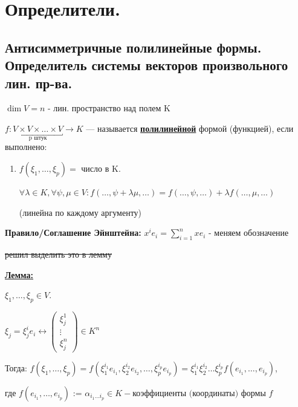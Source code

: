 \section{Определители.}

\subsection{Антисимметричные полилинейные формы. Определитель системы векторов произвольного лин. пр-ва.}

\(\dim V = n\) - лин. пространство над полем K

\(f: \underbracket{V \times V \times \ldots \times V}_{\text{p штук}} \rightarrow K\) --- называется \uline{\textbf{полилинейной}} формой (функцией), если выполнено:

\begin{enumerate}
    \item[]

          \(f(\xi_1,\ldots,\xi_p) = \) число в K.

          \(\forall \lambda \in K, \forall \psi, \mu \in V: f(\ldots,\psi + \lambda \mu,\ldots) = f(\ldots, \psi, \ldots) + \lambda f(\ldots,\mu,\ldots)\)

          (линейна по каждому аргументу)
\end{enumerate}



\textbf{Правило/Соглашение Эйнштейна:} \(x^i e_i = \sum\limits_{i=1}^n x e_i\) - меняем обозначение


\sout{решил выделить это в лемму} %

\uline{\textbf{Лемма:}}

$\xi_1,\ldots, \xi_p \in V$.

\(\xi_j  = \xi_j^ie_i \leftrightarrow \begin{pmatrix}
    \xi_j^1 \\
    \vdots  \\
    \xi_j^n
\end{pmatrix} \in K^n \)

Тогда: \(f(\xi_1,\ldots,\xi_p) = f(\xi_1^{i_1}e_{i_1}, \xi_2^{i_2}e_{i_2},\ldots, \xi^{i_p}_p e_{i_p}) =  \xi_1^{i_1} \xi_2^{i_2}\ldots \xi_p^{i_p} f(e_{i_1},
\ldots,e_{i_p})\), 

где \( f(e_{i_1},
\ldots,e_{i_p}) \text{ := }\alpha_{i_1\dots i_p}\in K - \text{коэффициенты (координаты) формы }f\)

